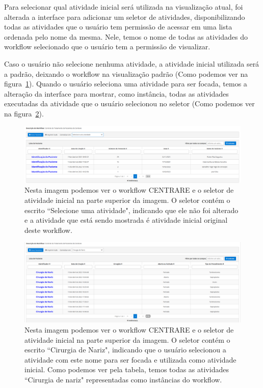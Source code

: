 Para selecionar qual atividade inicial será utilizada na visualização atual, foi alterada a interface para adicionar um seletor de atividades, disponibilizando todas as atividades que o usuário tem permissão de acessar em uma lista ordenada pelo nome da mesma. Nele, temos o nome de todas as atividades do workflow selecionado que o usuário tem a permissão de visualizar.

Caso o usuário não selecione nenhuma atividade, a atividade inicial utilizada será a padrão, deixando o workflow na visualização padrão (Como podemos ver na figura~\ref{fig:centrare_seletor_normal}). Quando o usuário seleciona uma atividade para ser focada, temos a alteração da interface para mostrar, como instância, todas as atividades executadas da atividade que o usuário selecionou no seletor (Como podemos ver na figura~\ref{fig:centrare_seletor_alterado}).

\begin{figure}
    \centering
    \includegraphics[width=1\textwidth]{imgs/CENTRARE/instanciaNormal.png}
    \caption{Nesta imagem podemos ver o workflow CENTRARE e o seletor de atividade inicial na parte superior da imagem. O seletor contém o escrito ``Selecione uma atividade", indicando que ele não foi alterado e a atividade que está sendo mostrada é atividade inicial original deste workflow.}
    \label{fig:centrare_seletor_normal}
\end{figure}

\begin{figure}
    \centering
    \includegraphics[width=1\textwidth]{imgs/CENTRARE/instanciaAlterada.png}
    \caption{Nesta imagem podemos ver o workflow CENTRARE e o seletor de atividade inicial na parte superior da imagem. O seletor contém o escrito ``Cirurgia de Nariz", indicando que o usuário selecionou a atividade com este nome para ser focada e utilizada como atividade inicial. Como podemos ver pela tabela, temos todas as atividades ``Cirurgia de nariz" representadas como instâncias do workflow.}
    \label{fig:centrare_seletor_alterado}
\end{figure}


